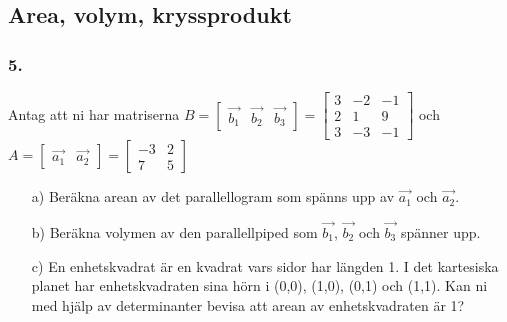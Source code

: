 \documentclass{article}
\begin{document}
\subsection*{Area, volym, kryssprodukt}
\subsubsection*{5.}
Antag att ni har matriserna $B=\begin{bmatrix} \vec{b_1} & \vec{b_2} & \vec{b_3} \end{bmatrix} = \begin{bmatrix}3 & -2 & -1\\ 2 & 1 & 9 \\ 3 & -3 & -1\end{bmatrix}$ och $A = \begin{bmatrix} \vec{a_1} & \vec{a_2}\end{bmatrix} =\begin{bmatrix} -3 & 2 \\ 7 & 5\end{bmatrix}$
\begin{itemize}
	\item[a) ] Beräkna arean av det parallellogram som spänns upp av $\vec{a_1}$ och $\vec{a_2}$.
	\item[b) ] Beräkna volymen av den parallellpiped som $\vec{b_1}$, $\vec{b_2}$ och $\vec{b_3}$ spänner upp.
	\item[c) ] En enhetskvadrat är en kvadrat vars sidor har längden 1. I det kartesiska planet har enhetskvadraten sina hörn i (0,0), (1,0), (0,1) och (1,1). Kan ni med hjälp av determinanter bevisa att arean av enhetskvadraten är 1? 
\end{itemize}
\end{document}
